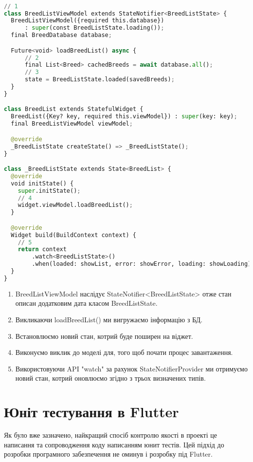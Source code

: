 \begin{lstlisting}[style=light, language=Python,label={lst:flutter_sqflite},caption=Flutter SQFLITE]

// 1
class BreedListViewModel extends StateNotifier<BreedListState> {
  BreedListViewModel({required this.database})
      : super(const BreedListState.loading());
  final BreedDatabase database;

  Future<void> loadBreedList() async {
      // 2
      final List<Breed> cachedBreeds = await database.all();
      // 3
      state = BreedListState.loaded(savedBreeds);
  }
}

class BreedList extends StatefulWidget {
  BreedList({Key? key, required this.viewModel}) : super(key: key);
  final BreedListViewModel viewModel;

  @override
  _BreedListState createState() => _BreedListState();
}

class _BreedListState extends State<BreedList> {
  @override
  void initState() {
    super.initState();
    // 4
    widget.viewModel.loadBreedList();
  }

  @override
  Widget build(BuildContext context) {
    // 5
    return context
        .watch<BreedListState>()
        .when(loaded: showList, error: showError, loading: showLoading);
  }
}
\end{lstlisting}

\begin{enumerate}
    \item BreedListViewModel наслідує StateNotifier<BreedListState> отже стан описан додатковим дата класом BreedListState.
    \item Викликаючи loadBreedList() ми вигружаємо інформацію з БД.
    \item Встановлюємо новий стан, котрий буде поширен на віджет.
    \item Виконуємо виклик до моделі для, того щоб почати процес завантаження.
    \item Використовуючи API "watch" за рахунок StateNotifierProvider ми отримуємо новий стан, котрий оновлюємо згідно з трьох визначених типів.
\end{enumerate}


\section{Юніт тестування в Flutter}
\label{section.3.6}
Як було вже зазначено, найкращий спосіб контролю якості в проекті це написання та сопроводження коду написанням юнит тестів.
Цей підхід до розробки програмного забезпечення не оминув і розробку під Flutter.

